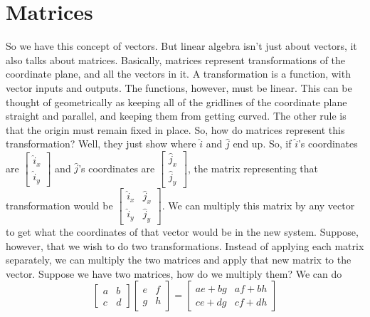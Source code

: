 \section{Matrices}
So we have this concept of vectors. But linear algebra isn't just about vectors, it also talks about matrices. Basically, matrices represent transformations of the coordinate plane, and all the vectors in it. A transformation is a function, with vector inputs and outputs. The functions, however, must be linear. This can be thought of geometrically as keeping all of the gridlines of the coordinate plane straight and parallel, and keeping them from getting curved. The other rule is that the origin must remain fixed in place.
So, how do matrices represent this transformation? Well, they just show where $\hat{i}$ and $\hat{j}$ end up. So, if $\hat{i}$'s coordinates are $\begin{bmatrix}\hat{i}_x\\\hat{i}_y\end{bmatrix}$ and $\hat{j}$'s coordinates are $\begin{bmatrix}\hat{j}_x\\\hat{j}_y\end{bmatrix}$, the matrix representing that transformation would be $\begin{bmatrix}\hat{i}_x & \hat{j}_x\\\hat{i}_y & \hat{j}_y\end{bmatrix}$. We can multiply this matrix by any vector to get what the coordinates of that vector would be in the new system.
Suppose, however, that we wish to do two transformations. Instead of applying each matrix separately, we can multiply the two matrices and apply that new matrix to the vector. Suppose we have two matrices, how do we multiply them? We can do
\begin{equation*}
\begin{bmatrix}a&b\\c&d\end{bmatrix}\begin{bmatrix}e&f\\g&h\end{bmatrix}=\begin{bmatrix}ae+bg&af+bh\\ce+dg&cf+dh\end{bmatrix}
\end{equation*}
